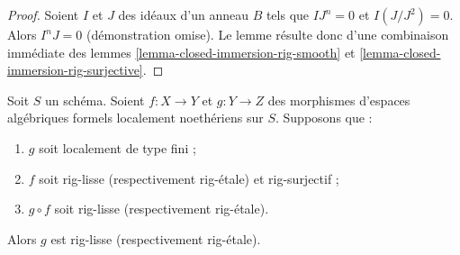 \begin{proof}
Soient $I$ et $J$ des idéaux d'un anneau $B$ tels que $IJ^n = 0$ et
$I(J/J^2) = 0$. Alors $I^nJ = 0$ (démonstration omise).
Le lemme résulte donc d'une combinaison immédiate des
lemmes \ref{lemma-closed-immersion-rig-smooth} et
\ref{lemma-closed-immersion-rig-surjective}.
\end{proof}

\begin{lemma}
\label{lemma-rig-etale-descent}
Soit $S$ un schéma. Soient $f : X \to Y$ et $g : Y \to Z$
des morphismes d'espaces algébriques formels localement noethériens sur $S$.
Supposons que :
\begin{enumerate}
\item $g$ soit localement de type fini ;
\item $f$ soit rig-lisse (respectivement rig-étale) et rig-surjectif ;
\item $g \circ f$ soit rig-lisse (respectivement rig-étale).
\end{enumerate}
Alors $g$ est rig-lisse (respectivement rig-étale).
\end{lemma}

